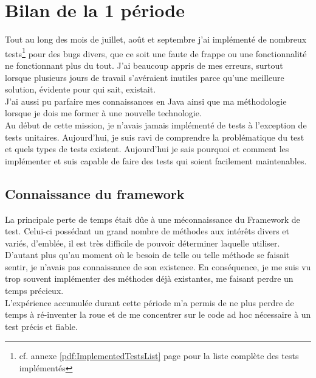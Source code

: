 \clearpage
\section{Bilan de la 1 p\'{e}riode}
Tout au long des mois de juillet, ao\^{u}t et septembre j'ai impl\'{e}ment\'{e} de nombreux tests\footnote{cf. annexe \ref{pdf:ImplementedTestsList} page \pageref{pdf:ImplementedTestsList} pour la liste compl\`{e}te des tests impl\'{e}ment\'{e}s} pour des bugs divers, que ce soit une faute de frappe ou une fonctionnalit\'{e} ne fonctionnant plus du tout. J'ai beaucoup appris de mes erreurs, surtout lorsque plusieurs jours de travail s'av\'{e}raient inutiles parce qu'une meilleure solution, \'{e}vidente pour qui sait, existait.\\
J'ai aussi pu parfaire mes connaissances en Java ainsi que ma m\'{e}thodologie lorsque je dois me former \`{a} une nouvelle technologie.\\
Au d\'{e}but de cette mission, je n'avais jamais impl\'{e}ment\'{e} de tests \`{a} l'exception de tests unitaires. Aujourd'hui, je suis ravi de comprendre la probl\'{e}matique du test et quels types de tests existent. Aujourd'hui je sais pourquoi et comment les impl\'{e}menter et suis capable de faire des tests qui soient facilement maintenables.




\subsection{Connaissance du framework}
La principale perte de temps \'{e}tait d\^{u}e \`{a} une m\'{e}connaissance du Framework de test. Celui-ci poss\'{e}dant un grand nombre de m\'{e}thodes aux int\'{e}r\^{e}ts divers et vari\'{e}s, d'embl\'{e}e, il est tr\`{e}s difficile de pouvoir d\'{e}terminer laquelle utiliser. D'autant plus qu'au moment o\`{u} le besoin de telle ou telle m\'{e}thode se faisait sentir, je n'avais pas connaissance de son existence. En cons\'{e}quence, je me suis vu trop souvent impl\'{e}menter des m\'{e}thodes d\'{e}j\`{a} existantes, me faisant perdre un temps pr\'{e}cieux.\\
L'exp\'{e}rience accumul\'{e}e durant cette p\'{e}riode m'a permis de ne plus perdre de temps \`{a} r\'{e}-inventer la roue et de me concentrer sur le code ad hoc n\'{e}cessaire \`{a} un test pr\'{e}cis et fiable.

